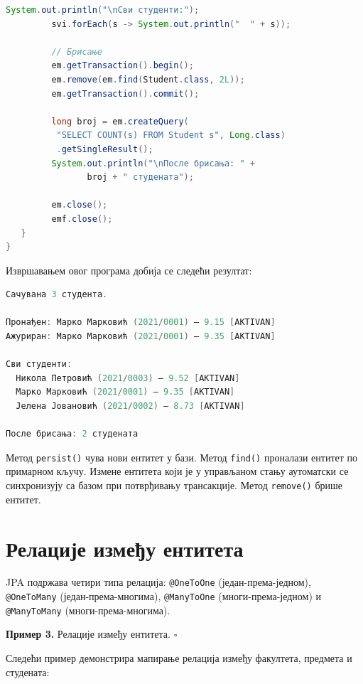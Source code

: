 \begin{lstlisting}[language=Java]
         System.out.println("\nСви студенти:");
         svi.forEach(s -> System.out.println("  " + s));
 
         // Брисање
         em.getTransaction().begin();
         em.remove(em.find(Student.class, 2L));
         em.getTransaction().commit();
 
         long broj = em.createQuery(
          "SELECT COUNT(s) FROM Student s", Long.class)
          .getSingleResult();
         System.out.println("\nПосле брисања: " +
                broj + " студената");
 
         em.close();
         emf.close();
   }
}
\end{lstlisting}


Извршавањем овог програма добија се следећи резултат:


\begin{lstlisting}[language=Java]
Сачувана 3 студента.
 
Пронађен: Марко Марковић (2021/0001) – 9.15 [AKTIVAN]
Ажуриран: Марко Марковић (2021/0001) – 9.35 [AKTIVAN]
 
Сви студенти:
  Никола Петровић (2021/0003) – 9.52 [AKTIVAN]
  Марко Марковић (2021/0001) – 9.35 [AKTIVAN]
  Јелена Јовановић (2021/0002) – 8.73 [AKTIVAN]
 
После брисања: 2 студената
\end{lstlisting}


Метод \texttt{persist()} чува нови ентитет у бази. Метод \texttt{find()} проналази ентитет по примарном кључу. Измене ентитета који је у управљаном стању аутоматски се синхронизују са базом при потврђивању трансакције. Метод \texttt{remove()} брише ентитет.


\section{Релације између ентитета}

JPA подржава четири типа релација: \texttt{@OneToOne} (један-према-једном), \texttt{@OneToMany} (један-према-многима), \texttt{@ManyToOne} (многи-према-једном) и \texttt{@ManyToMany} (многи-према-многима).


\bigskip

\noindent \textbf{Пример 3.} Релације између ентитета. $\square$

\medskip

Следећи пример демонстрира мапирање релација између факултета, предмета и студената:


